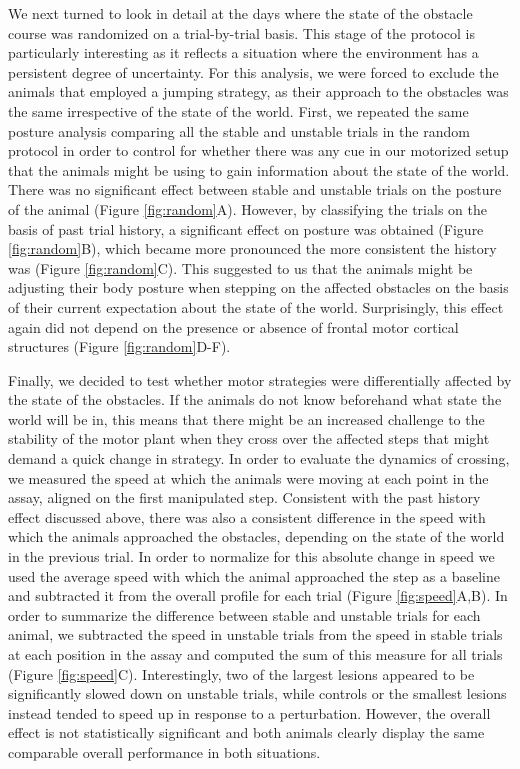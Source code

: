 We next turned to look in detail at the days where the state of the obstacle course was randomized on a trial-by-trial basis. This stage of the protocol is particularly interesting as it reflects a situation where the environment has a persistent degree of uncertainty. For this analysis, we were forced to exclude the animals that employed a jumping strategy, as their approach to the obstacles was the same irrespective of the state of the world. First, we repeated the same posture analysis comparing all the stable and unstable trials in the random protocol in order to control for whether there was any cue in our motorized setup that the animals might be using to gain information about the state of the world. There was no significant effect between stable and unstable trials on the posture of the animal (Figure \ref{fig:random}A). However, by classifying the trials on the basis of past trial history, a significant effect on posture was obtained (Figure \ref{fig:random}B), which became more pronounced the more consistent the history was (Figure \ref{fig:random}C). This suggested to us that the animals might be adjusting their body posture when stepping on the affected obstacles on the basis of their current expectation about the state of the world. Surprisingly, this effect again did not depend on the presence or absence of frontal motor cortical structures (Figure \ref{fig:random}D-F).

Finally, we decided to test whether motor strategies were differentially affected by the state of the obstacles. If the animals do not know beforehand what state the world will be in, this means that there might be an increased challenge to the stability of the motor plant when they cross over the affected steps that might demand a quick change in strategy. In order to evaluate the dynamics of crossing, we measured the speed at which the animals were moving at each point in the assay, aligned on the first manipulated step. Consistent with the past history effect discussed above, there was also a consistent difference in the speed with which the animals approached the obstacles, depending on the state of the world in the previous trial. In order to normalize for this absolute change in speed we used the average speed with which the animal approached the step as a baseline and subtracted it from the overall profile for each trial (Figure \ref{fig:speed}A,B). In order to summarize the difference between stable and unstable trials for each animal, we subtracted the speed in unstable trials from the speed in stable trials at each position in the assay and computed the sum of this measure for all trials (Figure \ref{fig:speed}C). Interestingly, two of the largest lesions appeared to be significantly slowed down on unstable trials, while controls or the smallest lesions instead tended to speed up in response to a perturbation. However, the overall effect is not statistically significant and both animals clearly display the same comparable overall performance in both situations.

